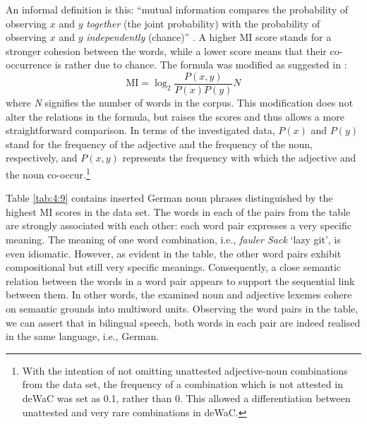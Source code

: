 \noindent An informal definition is this: ``mutual information compares the probability of observing $x$ and $y$ \textit{together} (the joint probability) with the probability of observing $x$ and $y$ \textit{independently} (chance)'' \citep[23]{church-hanks-1990}. A higher MI score stands for a stronger cohesion between the words, while a lower score means that their co-occurrence is rather due to chance. The formula was modified as suggested in \citet{wiechmann-2008}: \[  \text{MI} = \log_2 \frac{P(x,y)}{P(x)P(y)}N \]  where \textit{N} signifies the number of words in the corpus. This modification does not alter the relations in the formula, but raises the scores and thus allows a more straightforward comparison. In terms of the investigated data, $P(x)$ and $P(y)$ stand for the frequency of the adjective and the frequency of the noun, respectively, and $P(x,y)$ represents the frequency with which the adjective and the noun co-occur.\footnote{With the intention of not omitting unattested adjective-noun combinations from the data set, the frequency of a combination which is not attested in deWaC was set as 0.1, rather than 0. This allowed a differentiation between unattested and very rare combinations in deWaC.}

Table \ref{tab:4:9} contains inserted German noun phrases distinguished by the highest MI scores in the data set. The words in each of the pairs from the table are strongly associated with each other: each word pair expresses a very specific meaning. The meaning of one word combination, i.e., \textit{fauler Sack} `lazy git', is even idiomatic. However, as evident in the table, the other word pairs exhibit compositional but still very specific meanings. Consequently, a close semantic relation between the words in a word pair appears to support the sequential link between them. In other words, the examined noun and adjective lexemes cohere on semantic grounds into multiword units. Observing the word pairs in the table, we can assert that in bilingual speech, both words in each pair are indeed realised in the same language, i.e., German.

